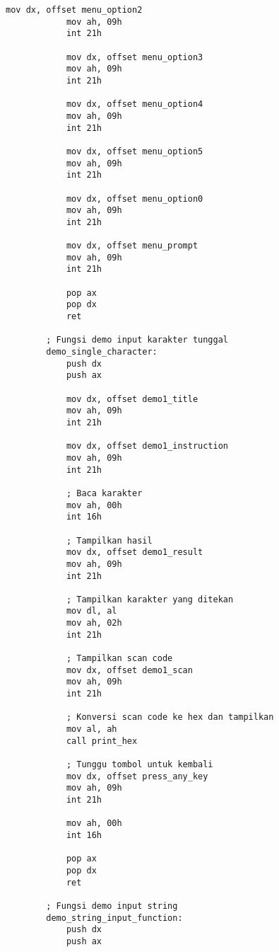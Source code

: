 \documentclass[../main.tex]{subfiles}
\begin{document}
\begin{lstlisting}[language={[x86masm]Assembler}, caption=Program Lengkap - Keyboard Input Demo, label={lst:complete-demo}]
            mov dx, offset menu_option2
            mov ah, 09h
            int 21h
            
            mov dx, offset menu_option3
            mov ah, 09h
            int 21h
            
            mov dx, offset menu_option4
            mov ah, 09h
            int 21h
            
            mov dx, offset menu_option5
            mov ah, 09h
            int 21h
            
            mov dx, offset menu_option0
            mov ah, 09h
            int 21h
            
            mov dx, offset menu_prompt
            mov ah, 09h
            int 21h
            
            pop ax
            pop dx
            ret
        
        ; Fungsi demo input karakter tunggal
        demo_single_character:
            push dx
            push ax
            
            mov dx, offset demo1_title
            mov ah, 09h
            int 21h
            
            mov dx, offset demo1_instruction
            mov ah, 09h
            int 21h
            
            ; Baca karakter
            mov ah, 00h
            int 16h
            
            ; Tampilkan hasil
            mov dx, offset demo1_result
            mov ah, 09h
            int 21h
            
            ; Tampilkan karakter yang ditekan
            mov dl, al
            mov ah, 02h
            int 21h
            
            ; Tampilkan scan code
            mov dx, offset demo1_scan
            mov ah, 09h
            int 21h
            
            ; Konversi scan code ke hex dan tampilkan
            mov al, ah
            call print_hex
            
            ; Tunggu tombol untuk kembali
            mov dx, offset press_any_key
            mov ah, 09h
            int 21h
            
            mov ah, 00h
            int 16h
            
            pop ax
            pop dx
            ret
        
        ; Fungsi demo input string
        demo_string_input_function:
            push dx
            push ax
            

\end{lstlisting}
\end{document}
